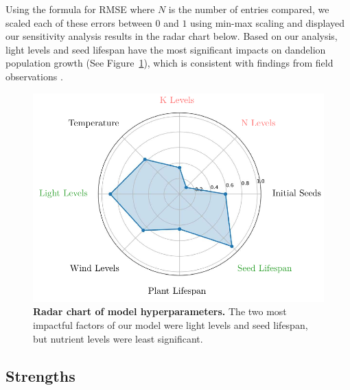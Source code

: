 Using the formula for RMSE where \(N\) is the number of entries compared, we scaled each of these errors between \(0\) and \(1\) using min-max scaling and displayed our sensitivity analysis results in the radar chart below. Based on our analysis, light levels and seed lifespan have the most significant impacts on dandelion population growth (See Figure~\ref{fig:radarchart1}), which is consistent with findings from field observations \cite{chepil_germination_1946}.

\begin{figure}[h!]
\centering
    \includegraphics[scale=0.6]{figures/radarchart2.pdf}
    \captionsetup{width=0.9\textwidth}
    \caption{\textbf{Radar chart of model hyperparameters.} The two most impactful factors of our model were light levels and seed lifespan, but nutrient levels were least significant.} 
    \label{fig:radarchart1}
\end{figure}

\subsection{Strengths}

